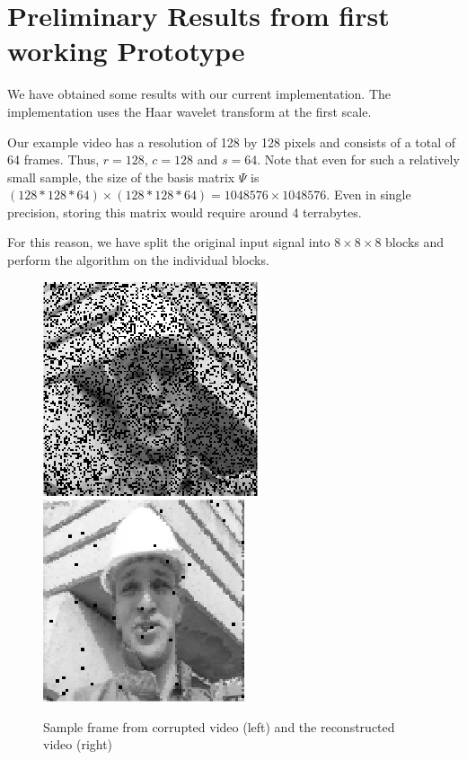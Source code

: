\documentclass[final,3p]{report}
\begin{document}
\section{Preliminary Results from first working Prototype}
We have obtained some results with our current implementation.
The implementation uses the Haar wavelet transform at the first scale.

Our example video has a resolution of 128 by 128 pixels and consists of a total of 64 frames.
Thus, $r = 128$, $c = 128$ and $s = 64$.
Note that even for such a relatively small sample, the size of the basis matrix $\Psi$ is $(128*128*64)\times(128*128*64) = 1048576\times 1048576$.
Even in single precision, storing this matrix would require around 4 terrabytes.

For this reason, we have split the original input signal into $8\times 8\times 8$ blocks and perform the algorithm on the individual blocks.
\begin{figure}
\label{fig:foreman}
\includegraphics{corr.png}
\includegraphics{rec.png}
\caption{Sample frame from corrupted video (left) and the reconstructed video (right)}
\end{figure}
\end{document}
